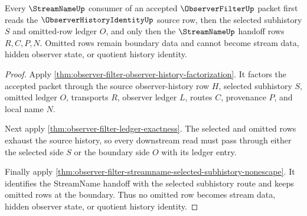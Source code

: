 \begin{theorem}
\label{thm:observer-filter-observerhistoryidentity-streamname-lattice-route}
Every $\StreamNameUp$ consumer of an accepted $\ObserverFilterUp$ packet first reads the $\ObserverHistoryIdentityUp$ source row, then the selected subhistory $S$ and omitted-row ledger $O$, and only then the $\StreamNameUp$ handoff rows $R,C,P,N$. Omitted rows remain boundary data and cannot become stream data, hidden observer state, or quotient history identity.
\end{theorem}
\begin{proof}
Apply \autoref{thm:observer-filter-observer-history-factorization}. It factors the accepted packet through the source observer-history row $H$, selected subhistory $S$, omitted ledger $O$, transports $R$, observer ledger $L$, routes $C$, provenance $P$, and local name $N$.

Next apply \autoref{thm:observer-filter-ledger-exactness}. The selected and omitted rows exhaust the source history, so every downstream read must pass through either the selected side $S$ or the boundary side $O$ with its ledger entry.

Finally apply \autoref{thm:observer-filter-streamname-selected-subhistory-nonescape}. It identifies the StreamName handoff with the selected subhistory route and keeps omitted rows at the boundary. Thus no omitted row becomes stream data, hidden observer state, or quotient history identity.
\end{proof}

